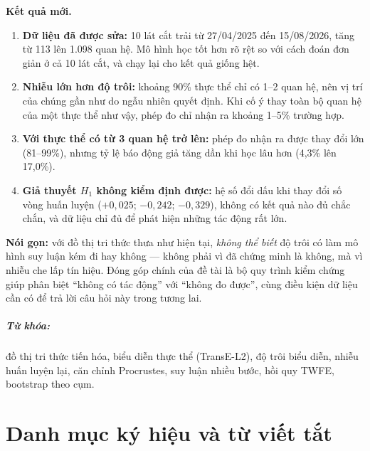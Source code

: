 \documentclass[12pt,a4paper,oneside]{report}
\theoremstyle{definition}
\theoremstyle{plain}
\theoremstyle{remark}
\begin{document}
\textbf{Kết quả mới.}
\begin{enumerate}
    \item \textbf{Dữ liệu đã được sửa:} 10 lát cắt trải từ 27/04/2025 đến 15/08/2026, tăng từ 113 lên 1.098 quan hệ. Mô hình học tốt hơn rõ rệt so với cách đoán đơn giản ở cả 10 lát cắt, và chạy lại cho kết quả giống hệt.
    \item \textbf{Nhiễu lớn hơn độ trôi:} khoảng 90\% thực thể chỉ có 1--2 quan hệ, nên vị trí của chúng gần như do ngẫu nhiên quyết định. Khi cố ý thay toàn bộ quan hệ của một thực thể như vậy, phép đo chỉ nhận ra khoảng 1--5\% trường hợp.
    \item \textbf{Với thực thể có từ 3 quan hệ trở lên:} phép đo nhận ra được thay đổi lớn (81--99\%), nhưng tỷ lệ báo động giả tăng dần khi học lâu hơn (4,3\% lên 17,0\%).
    \item \textbf{Giả thuyết $H_1$ không kiểm định được:} hệ số đổi dấu khi thay đổi số vòng huấn luyện ($+0{,}025$; $-0{,}242$; $-0{,}329$), không có kết quả nào đủ chắc chắn, và dữ liệu chỉ đủ để phát hiện những tác động rất lớn.
\end{enumerate}
\textbf{Nói gọn:} với đồ thị tri thức thưa như hiện tại, \textit{không thể biết} độ trôi có làm mô hình suy luận kém đi hay không --- không phải vì đã chứng minh là không, mà vì nhiễu che lấp tín hiệu. Đóng góp chính của đề tài là bộ quy trình kiểm chứng giúp phân biệt ``không có tác động'' với ``không đo được'', cùng điều kiện dữ liệu cần có để trả lời câu hỏi này trong tương lai.
\paragraph{Từ khóa:} đồ thị tri thức tiến hóa, biểu diễn thực thể (TransE-L2), độ trôi biểu diễn, nhiễu huấn luyện lại, căn chỉnh Procrustes, suy luận nhiều bước, hồi quy TWFE, bootstrap theo cụm.

\clearpage

\tableofcontents
\clearpage

\listoffigures
\clearpage

\listoftables
\clearpage

\chapter*{Danh mục ký hiệu và từ viết tắt}
\end{document}
